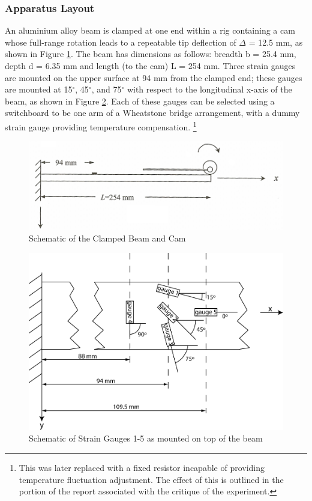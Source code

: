 \documentclass[12pt]{article}
\begin{document}
\subsubsection{Apparatus Layout}
An aluminium alloy beam is clamped at one end within a rig containing a cam whose full-range rotation leads to a repeatable tip deflection of $\Delta$ = 12.5 mm, as shown in Figure \ref{exp1}. The beam has dimensions as follows: breadth b = 25.4 mm, depth d = 6.35 mm and length (to the cam) L = 254 mm. Three strain gauges are mounted on the upper surface at 94 mm from the clamped end; these gauges are mounted at 15$^{\circ}$, 45$^{\circ}$, and 75$^{\circ}$ with respect to the longitudinal x-axis of the beam, as shown in Figure \ref{exp2}. Each of these gauges can be selected using a switchboard to be one arm of a Wheatstone bridge arrangement, with a dummy strain gauge providing temperature compensation. \footnote{This was later replaced with a fixed resistor incapable of providing temperature fluctuation adjustment. The effect of this is outlined in the portion of the report associated with the critique of the experiment.}
\begin{figure}[ht]
	\graphicspath{{C:/Users/Jack/Pictures/}}
	\includegraphics[width=\linewidth]{experiment1}
	\centering
	\caption{\label{exp1} Schematic of the Clamped Beam and Cam}
\end{figure}
\begin{figure}[H]
	\graphicspath{{C:/Users/Jack/Pictures/}}
	\includegraphics[width=\linewidth]{experiment2}
	\caption{\label{exp2} Schematic of Strain Gauges 1-5 as mounted on top of the beam}
\end{figure}
\newpage
\end{document}
